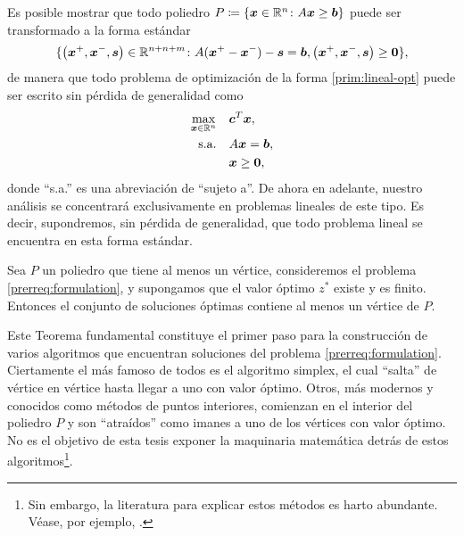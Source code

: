 Es posible mostrar que todo poliedro $P \coloneq \lbrace \boldsymbol{x} \in \mathbb{R}^n \colon A\boldsymbol{x} \geq
\boldsymbol{b} \rbrace$ puede ser transformado a la forma estándar
\begin{equation*}
	\lbrace \left( \boldsymbol{x}^+, \boldsymbol{x}^-, \boldsymbol{s} \right) \in \mathbb{R}^{n + n + m} \colon A(\boldsymbol{x}^+ -
\boldsymbol{x}^-) - \boldsymbol{s} = \boldsymbol{b}, \left(\boldsymbol{x}^+, \boldsymbol{x}^-, \boldsymbol{s}\right) \geq \boldsymbol{0}\rbrace,
\end{equation*}
de manera que todo problema de optimización de la forma \eqref{prim:lineal-opt} puede ser escrito
sin pérdida de generalidad como
\begin{subequations}
	\label{prerreq:formulation}
	\begin{align}
		\max_{\boldsymbol{x} \in \mathbb{R}^n} \quad
			& \boldsymbol{c}^T\boldsymbol{x}, \label{prerreq:formulation:objective} \\
		\text{s.a.} \quad
			& A\boldsymbol{x} = \boldsymbol{b}, \label{prerreq:formulation:constraints} \\
			& \boldsymbol{x} \geq \boldsymbol{0} \nonumber,
	\end{align}
\end{subequations}
donde ``s.a.'' es una abreviación de ``sujeto a''. De ahora en adelante, nuestro análisis se
concentrará exclusivamente en problemas lineales de este tipo. Es decir, supondremos, sin pérdida de
generalidad, que todo problema lineal se encuentra en esta forma estándar.

\begin{theorem}
	\label{prerreq:th:linear-sol}
	Sea $P$ un poliedro que tiene al menos un vértice, consideremos el problema
	\eqref{prerreq:formulation}, y supongamos que el valor óptimo $z^*$ existe y es finito. Entonces
	el conjunto de soluciones óptimas contiene al menos un vértice de $P$.
\end{theorem}

Este Teorema fundamental constituye el primer paso para la construcción de varios algoritmos que
encuentran soluciones del problema \eqref{prerreq:formulation}. Ciertamente el más famoso de todos
es el algoritmo simplex, el cual ``salta'' de vértice en vértice hasta llegar a uno con valor
óptimo. Otros, más modernos y conocidos como métodos de puntos interiores, comienzan en el interior
del poliedro $P$ y son ``atraídos'' como imanes a uno de los vértices con valor óptimo. No es el
objetivo de esta tesis exponer la maquinaria matemática detrás de estos algoritmos\footnote{
	Sin embargo, la literatura para explicar estos métodos es harto abundante. Véase, por ejemplo,
	\cite{nocedal}.
}.

